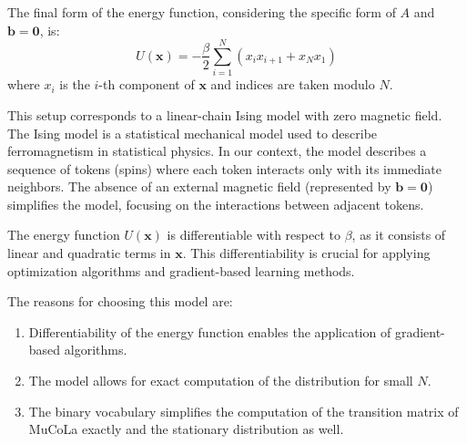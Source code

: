 \documentclass{article}
\begin{document}
The final form of the energy function, considering the specific form of \(A\) and \(\boldsymbol{b} = \boldsymbol{0}\), is:
\[ U(\boldsymbol{x}) = - \frac{\beta}{2} \sum_{i=1}^{N} (x_i x_{i+1} + x_{N} x_{1}) \]
where \(x_i\) is the \(i\)-th component of \(\boldsymbol{x}\) and indices are taken modulo \(N\).

This setup corresponds to a linear-chain Ising model with zero magnetic field. The Ising model is a statistical mechanical model used to describe ferromagnetism in statistical physics. In our context, the model describes a sequence of tokens (spins) where each token interacts only with its immediate neighbors. The absence of an external magnetic field (represented by \(\boldsymbol{b} = \boldsymbol{0}\)) simplifies the model, focusing on the interactions between adjacent tokens.

The energy function \(U(\boldsymbol{x})\) is differentiable with respect to \(\beta\), as it consists of linear and quadratic terms in \(\boldsymbol{x}\). This differentiability is crucial for applying optimization algorithms and gradient-based learning methods.

The reasons for choosing this model are:
\begin{enumerate}
    \item Differentiability of the energy function enables the application of gradient-based algorithms.
    \item The model allows for exact computation of the distribution for small \(N\).
    \item The binary vocabulary simplifies the computation of the transition matrix of MuCoLa exactly and the stationary distribution as well.
\end{enumerate}



\end{document}

